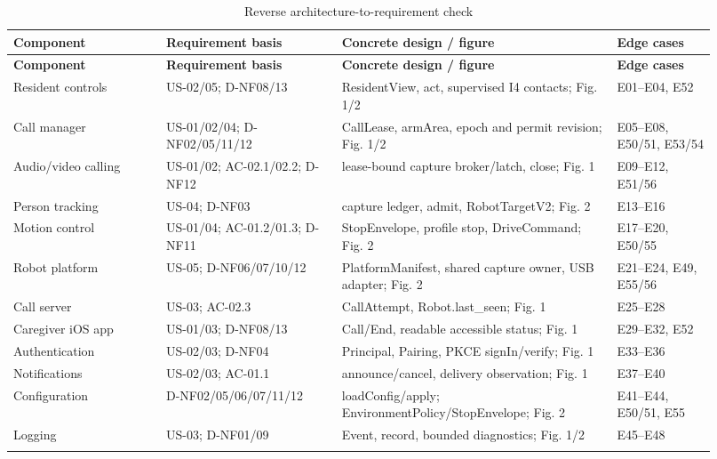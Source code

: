 \documentclass[12pt,letterpaper]{article}
\begin{document}
\begingroup\small
\begin{longtable}{@{}>{\RaggedRight\arraybackslash}p{0.2\linewidth}>{\RaggedRight\arraybackslash}p{0.23\linewidth}>{\RaggedRight\arraybackslash}p{0.36\linewidth}>{\RaggedRight\arraybackslash}p{0.13\linewidth}@{}}
\caption{Reverse architecture-to-requirement check}\\
\toprule\textbf{Component} & \textbf{Requirement basis} & \textbf{Concrete design / figure} & \textbf{Edge cases}\\\midrule\endfirsthead
\toprule\textbf{Component} & \textbf{Requirement basis} & \textbf{Concrete design / figure} & \textbf{Edge cases}\\\midrule\endhead
\midrule\endfoot\bottomrule\endlastfoot
Resident controls & US-02/05; D-NF08/13 & ResidentView, act, supervised I4 contacts; Fig. 1/2 & E01--E04, E52 \\ \addlinespace[3pt]
Call manager & US-01/02/04; D-NF02/05/11/12 & CallLease, armArea, epoch and permit revision; Fig. 1/2 & E05--E08, E50/51, E53/54 \\ \addlinespace[3pt]
Audio/video calling & US-01/02; AC-02.1/02.2; D-NF12 & lease-bound capture broker/latch, close; Fig. 1 & E09--E12, E51/56 \\ \addlinespace[3pt]
Person tracking & US-04; D-NF03 & capture ledger, admit, RobotTargetV2; Fig. 2 & E13--E16 \\ \addlinespace[3pt]
Motion control & US-01/04; AC-01.2/01.3; D-NF11 & StopEnvelope, profile stop, DriveCommand; Fig. 2 & E17--E20, E50/55 \\ \addlinespace[3pt]
Robot platform & US-05; D-NF06/07/10/12 & PlatformManifest, shared capture owner, USB adapter; Fig. 2 & E21--E24, E49, E55/56 \\ \addlinespace[3pt]
Call server & US-03; AC-02.3 & CallAttempt, Robot.last\_\allowbreak{}seen; Fig. 1 & E25--E28 \\ \addlinespace[3pt]
Caregiver iOS app & US-01/03; D-NF08/13 & Call/End, readable accessible status; Fig. 1 & E29--E32, E52 \\ \addlinespace[3pt]
Authentication & US-02/03; D-NF04 & Principal, Pairing, PKCE signIn/verify; Fig. 1 & E33--E36 \\ \addlinespace[3pt]
Notifications & US-02/03; AC-01.1 & announce/cancel, delivery observation; Fig. 1 & E37--E40 \\ \addlinespace[3pt]
Configuration & D-NF02/05/06/07/11/12 & loadConfig/apply; EnvironmentPolicy/StopEnvelope; Fig. 2 & E41--E44, E50/51, E55 \\ \addlinespace[3pt]
Logging & US-03; D-NF01/09 & Event, record, bounded diagnostics; Fig. 1/2 & E45--E48 \\ \addlinespace[3pt]
\end{longtable}\endgroup
\end{document}
